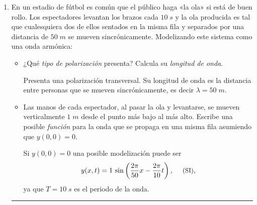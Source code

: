 \documentclass[a4paper,14pt]{exam}
\newcommand{\halmos}{\vspace*{-7mm}
	
					\begin{flushright}
						\rule{1mm}{2.5mm} 
					\end{flushright}\vspace*{-6mm}
						
					  }
\renewcommand{\qed}{\halmos}
\begin{document}
\begin{enumerate}
\newpage
{}		
		\item En un estadio de fútbol es común que el público haga «la ola» si está de buen rollo. Los espectadores levantan los brazos cada $10\;s$ y la ola producida es tal que cualesquiera dos de ellos sentados en la misma fila y separados por una distancia de $50\;m$ se mueven sincrónicamente. Modelizando este sistema como una onda armónica:
		\begin{itemize}
		\item[a)] ¿Qué \textit{tipo de polarización} presenta? Calcula su \textit{longitud de onda}.	
		\begin{mdframed}[backgroundcolor=yellow!20]  
		Presenta una polarización transversal. Su longitud de onda es la distancia entre personas que se mueven sincrónicamente, es decir $\lambda=50\;m$.
		\end{mdframed}				
		\item[b)] Las manos de cada espectador, al pasar la ola y levantarse, se mueven verticalmente $1\;m$ desde el punto más bajo al más alto. Escribe una posible \textit{función} para la onda que se propaga en una misma fila asumiendo que $y(0,0)=0$.
		\begin{mdframed}[backgroundcolor=yellow!20]  
		Si $y(0,0)=0$ una posible modelización puede ser
		\[y(x,t)=1\,\sin\left(\frac{2\pi}{50}x-\frac{2\pi}{10}t\right), \hspace{3ex}\text{\small (SI)},\]
		ya que $T=10\;s$ es el periodo de la onda.
		\end{mdframed}
		\end{itemize}
		\qed
		
\end{enumerate}		
 
\end{document}
